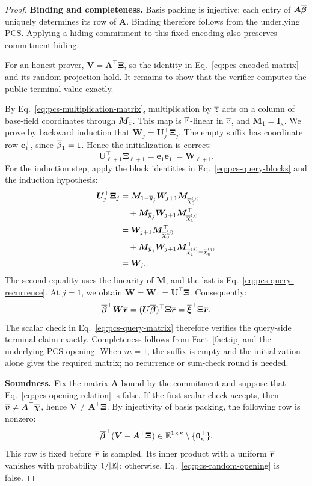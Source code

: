 \begin{proof}
\noindent\textbf{Binding and completeness.}
Basis packing is injective: each entry of
\(\bm A\overline{\bm\beta}\) uniquely determines its row of
\(\bm A\). Binding therefore follows from the underlying PCS.
Applying a hiding commitment to this fixed encoding also preserves
commitment hiding.

For an honest prover,
\(\bm V=\bm A^\top\bm\Xi\), so the identity in
Eq.~\eqref{eq:pcs-encoded-matrix} and its random projection hold.
It remains to show that the verifier computes the public terminal
value exactly.

By Eq.~\eqref{eq:pcs-multiplication-matrix}, multiplication by
\(\overline{z}\) acts on a column of base-field coordinates through
\(\bm M_{\overline{z}}\). This map is \({\mathbb{F}}\)-linear in \(\overline{z}\),
and \(\bm M_{1}=\bm I_\kappa\).
We prove by backward induction that
\(\bm W_j=\bm U_j^\top\bm\Xi_j\).
The empty suffix has coordinate row \(\bm e_1^\top\), since
\(\overline{\beta}_1=1\). Hence the initialization is correct:
\[
    \bm U_{\ell+1}^\top\bm\Xi_{\ell+1}
    =\bm e_1\bm e_1^\top
    =\bm W_{\ell+1}.
\]
For the induction step, apply the block identities in
Eq.~\eqref{eq:pcs-query-blocks} and the induction hypothesis:
\[
\begin{aligned}
    \bm U_j^\top\bm\Xi_j
    &=\bm M_{1-\overline{y}_j}\bm W_{j+1}
        \bm M_{\overline{\chi}^{(j)}_0}^\top\\
    &\quad{}+\bm M_{\overline{y}_j}\bm W_{j+1}
        \bm M_{\overline{\chi}^{(j)}_1}^\top\\
    &=\bm W_{j+1}\bm M_{\overline{\chi}^{(j)}_0}^\top\\
    &\quad{}+\bm M_{\overline{y}_j}\bm W_{j+1}
        \bm M_{\overline{\chi}^{(j)}_1-\overline{\chi}^{(j)}_0}^\top\\
    &=\bm W_j.
\end{aligned}
\]
The second equality uses the linearity of \(\bm M\), and the
last is Eq.~\eqref{eq:pcs-query-recurrence}.
At \(j=1\), we obtain
\(\bm W=\bm W_1=\bm U^\top\bm\Xi\). Consequently:
\[
    \overline{\bm\beta}^\top\bm W\overline{\bm r}
    =(\bm U\overline{\bm\beta})^\top\bm\Xi\overline{\bm r}
    =\overline{\bm\xi}^\top\bm\Xi\overline{\bm r}.
\]
The scalar check in Eq.~\eqref{eq:pcs-query-matrix} therefore
verifies the query-side terminal claim exactly. Completeness
follows from Fact~\ref{fact:ip} and the underlying PCS opening.
When \(m=1\), the suffix is empty and the initialization alone
gives the required matrix; no recurrence or sum-check round is
needed.

\smallskip\noindent\textbf{Soundness.}
Fix the matrix \(\bm A\) bound by the commitment and suppose that
Eq.~\eqref{eq:pcs-opening-relation} is false.
If the first scalar check accepts, then
\(\overline{\bm v}\neq\bm A^\top\overline{\bm\chi}\), hence
\(\bm V\neq\bm A^\top\bm\Xi\).
By injectivity of basis packing, the following row is nonzero:
\[
    \overline{\bm\beta}^{\top}
    (\bm V-\bm A^\top\bm\Xi)
    \in\mathbb{E}^{1\times\kappa}\setminus\{\bm0_\kappa^\top\}.
\]
This row is fixed before \(\overline{\bm r}\) is sampled. Its inner
product with a uniform \(\overline{\bm r}\) vanishes with probability
\(1/|\mathbb{E}|\); otherwise,
Eq.~\eqref{eq:pcs-random-opening} is false.


\end{proof}
